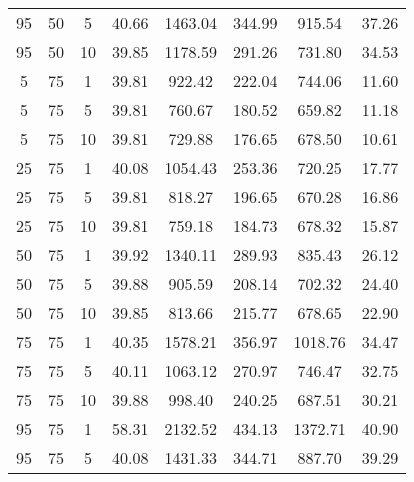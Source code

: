 \begin{table}[h]
\begin{tabular}{ccc|c|c|c|c|c}
95 & 50 & 5 & \cellcolor{gray!42}40.66 & \cellcolor{gray!1}1463.04 & \cellcolor{gray!1}344.99 & \cellcolor{gray!1}915.54 & 37.26\\
95 & 50 & 10 & \cellcolor{gray!50}39.85 & \cellcolor{gray!1}1178.59 & \cellcolor{gray!1}291.26 & \cellcolor{gray!28}731.80 & 34.53\\
5 & 75 & 1 & \cellcolor{gray!50}39.81 & \cellcolor{gray!18}922.42 & \cellcolor{gray!8}222.04 & \cellcolor{gray!25}744.06 & 11.60\\
5 & 75 & 5 & \cellcolor{gray!50}39.81 & \cellcolor{gray!45}760.67 & \cellcolor{gray!47}180.52 & \cellcolor{gray!50}659.82 & 11.18\\
5 & 75 & 10 & \cellcolor{gray!50}39.81 & \cellcolor{gray!50}729.88 & \cellcolor{gray!50}176.65 & \cellcolor{gray!45}678.50 & 10.61\\
25 & 75 & 1 & \cellcolor{gray!48}40.08 & \cellcolor{gray!1}1054.43 & \cellcolor{gray!1}253.36 & \cellcolor{gray!32}720.25 & 17.77\\
25 & 75 & 5 & \cellcolor{gray!50}39.81 & \cellcolor{gray!35}818.27 & \cellcolor{gray!32}196.65 & \cellcolor{gray!47}670.28 & 16.86\\
25 & 75 & 10 & \cellcolor{gray!50}39.81 & \cellcolor{gray!45}759.18 & \cellcolor{gray!43}184.73 & \cellcolor{gray!45}678.32 & 15.87\\
50 & 75 & 1 & \cellcolor{gray!49}39.92 & \cellcolor{gray!1}1340.11 & \cellcolor{gray!1}289.93 & \cellcolor{gray!1}835.43 & 26.12\\
50 & 75 & 5 & \cellcolor{gray!50}39.88 & \cellcolor{gray!21}905.59 & \cellcolor{gray!21}208.14 & \cellcolor{gray!37}702.32 & 24.40\\
50 & 75 & 10 & \cellcolor{gray!50}39.85 & \cellcolor{gray!36}813.66 & \cellcolor{gray!14}215.77 & \cellcolor{gray!45}678.65 & 22.90\\
75 & 75 & 1 & \cellcolor{gray!45}40.35 & \cellcolor{gray!1}1578.21 & \cellcolor{gray!1}356.97 & \cellcolor{gray!1}1018.76 & 34.47\\
75 & 75 & 5 & \cellcolor{gray!48}40.11 & \cellcolor{gray!1}1063.12 & \cellcolor{gray!1}270.97 & \cellcolor{gray!24}746.47 & 32.75\\
75 & 75 & 10 & \cellcolor{gray!50}39.88 & \cellcolor{gray!5}998.40 & \cellcolor{gray!1}240.25 & \cellcolor{gray!42}687.51 & 30.21\\
95 & 75 & 1 & \cellcolor{gray!1}58.31 & \cellcolor{gray!1}2132.52 & \cellcolor{gray!1}434.13 & \cellcolor{gray!1}1372.71 & 40.90\\
95 & 75 & 5 & \cellcolor{gray!48}40.08 & \cellcolor{gray!1}1431.33 & \cellcolor{gray!1}344.71 & \cellcolor{gray!1}887.70 & 39.29\\

\end{tabular}
\end{table}
